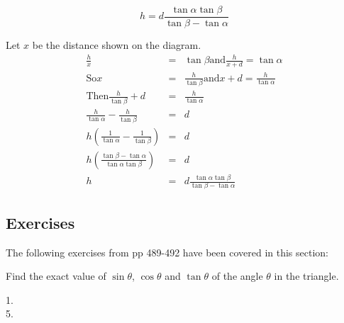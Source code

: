    
\setlength\fboxrule{0in}\setlength\fboxsep{0.2in}
\begin{equation*}h =d \frac{\tan  \alpha  \tan  \beta }{\tan  \beta  -\tan  \alpha }
\end{equation*}

Let $x$ be the distance shown on the diagram.
\begin{align*}\frac{h}{x} &  = & \tan  \beta \text{and}\frac{h}{x +d} =\tan  \alpha  \\
\text{So}x &  = & \frac{h}{\tan  \beta }\text{and}x +d =\frac{h}{\tan  \alpha } \\
\text{Then}\frac{h}{\tan  \beta } +d &  = & \frac{h}{\tan  \alpha } \\
\frac{h}{\tan  \alpha } -\frac{h}{\tan  \beta } &  = & d \\
h \left (\frac{1}{\tan  \alpha } -\frac{1}{\tan  \beta }\right ) &  = & d \\
h \genfrac{(}{)}{}{}{\tan  \beta  -\tan  \alpha }{\tan  \alpha  \tan  \beta } &  = & d \\
h &  = & d \frac{\tan  \alpha  \tan  \beta }{\tan  \beta  -\tan  \alpha }\end{align*}

\subsection{Exercises}
The following exercises from pp 489-492 have been covered in this section: 

Find the exact value of $\sin  \theta $, $\cos  \theta $ and $\tan  \theta $ of the angle $\theta $ in the triangle. 


\begin{description}
\item [1.]   
\columnsep =30pt
 

\item [5.]
\setlength\fboxrule{0in}\setlength\fboxsep{0.2in}
\end{description}

